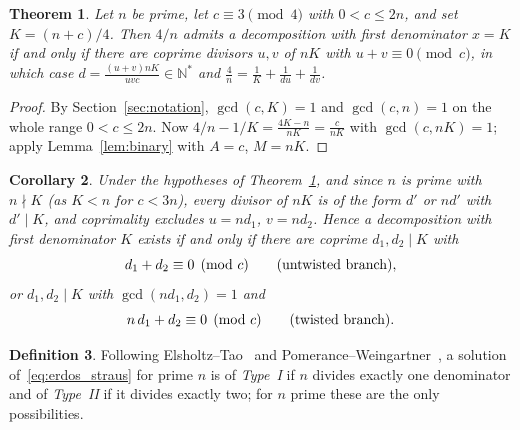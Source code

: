 \documentclass[11pt, a4paper]{article}
\theoremstyle{plain}
\newtheorem{theorem}{Theorem}[section]
\newtheorem{corollary}[theorem]{Corollary}
\theoremstyle{definition}
\newtheorem{definition}[theorem]{Definition}
\newcommand{\N}{\mathbb{N}}
\begin{document}
\begin{theorem}\label{thm:complete_shift}
Let $n$ be prime, let $c\equiv 3\pmod 4$ with $0<c\le2n$, and set $K=(n+c)/4$. Then $4/n$ admits a decomposition with first denominator $x=K$ if and only if there are coprime divisors $u,v$ of $nK$ with $u+v\equiv0\pmod c$, in which case $d=\frac{(u+v)nK}{uvc}\in\N^{*}$ and $\frac4n=\frac1K+\frac1{du}+\frac1{dv}$.
\end{theorem}
\begin{proof}
By Section~\ref{sec:notation}, $\gcd(c,K)=1$ and $\gcd(c,n)=1$ on the whole range $0<c\le2n$. Now $4/n-1/K=\frac{4K-n}{nK}=\frac{c}{nK}$ with $\gcd(c,nK)=1$; apply Lemma~\ref{lem:binary} with $A=c$, $M=nK$.
\end{proof}

\begin{corollary}\label{cor:two_branches}
Under the hypotheses of Theorem~\ref{thm:complete_shift}, and since $n$ is prime with $n\nmid K$ (as $K<n$ for $c<3n$), every divisor of $nK$ is of the form $d'$ or $nd'$ with $d'\mid K$, and coprimality excludes $u=nd_1$, $v=nd_2$. Hence a decomposition with first denominator $K$ exists if and only if there are coprime $d_1,d_2\mid K$ with
\begin{equation}\label{eq:untwisted}
d_1+d_2\equiv 0 \pmod c \qquad \textnormal{(untwisted branch)},
\end{equation}
or $d_1,d_2 \mid K$ with $\gcd(n d_1,d_2)=1$ and
\begin{equation}\label{eq:twisted}
n\,d_1+d_2\equiv 0 \pmod c \qquad \textnormal{(twisted branch)}.
\end{equation}
\end{corollary}

\begin{definition}\label{def:typeI_typeII}
Following Elsholtz--Tao~\cite{elsholtz2013} and Pomerance--Weingartner~\cite{pomerance2026}, a solution of~\eqref{eq:erdos_straus} for prime $n$ is of \emph{Type~I} if $n$ divides exactly one denominator and of \emph{Type~II} if it divides exactly two; for $n$ prime these are the only possibilities.
\end{definition}
\end{document}
